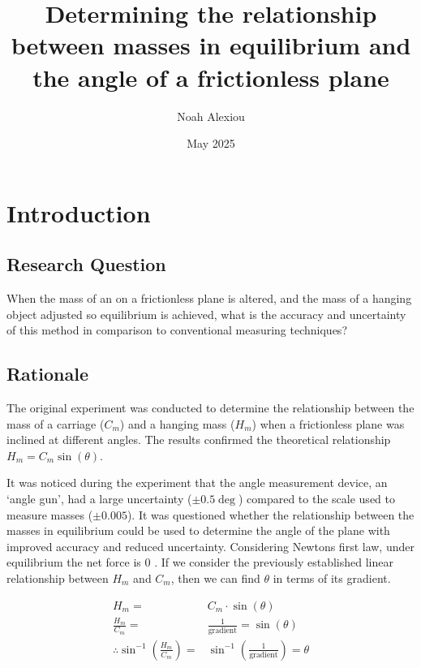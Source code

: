 \documentclass[11pt,a4paper]{article}
\begin{document}
\begin{titlepage}


\title{Determining the relationship between masses in equilibrium and the angle of a frictionless plane}

\author{Noah Alexiou}


\date{May 2025}

\maketitle
\centering

\end{titlepage}
\tableofcontents
\newpage

\section{Introduction}

\subsection{Research Question}
When the mass of an  on a frictionless plane is altered, and the mass of a hanging object adjusted so equilibrium is achieved, what is the accuracy and uncertainty of this method in comparison to conventional measuring techniques? 

\subsection{Rationale}

The original experiment was conducted to determine the relationship between the mass of a carriage ($C_m$) and a hanging mass ($H_m$) when a frictionless plane was inclined at different angles. The results confirmed the theoretical relationship $H_m = C_m \sin(\theta)$.

It was noticed during the experiment that the angle measurement device, an `angle gun', had a large uncertainty ($\pm0.5\deg$) compared to the scale used to measure masses ($\pm0.005$). It was questioned whether the relationship between the masses in equilibrium could be used to determine the angle of the plane with improved accuracy and reduced uncertainty. 
\newline
\newline
Considering Newtons first law, under equilibrium the net force is 0 \cite{encyclopediabritannica_2023_newtons}. If we consider the previously established linear relationship between $H_m$ and $C_m$, then we can find $\theta$ in terms of its gradient.
\begin{center}
	\begin{align*}
	H_m= &C_m\cdot{\sin(\theta)} \\
	\frac{H_m}{C_m}=&\frac{1}{\mathrm{gradient}}=\sin(\theta)\\
	\therefore \sin^{-1}\left(\frac{H_m}{{C_m}}\right)=&\sin^{-1}\left(\frac{1}{\textrm{gradient}}\right)=\theta
	\end{align*}
\end{center}
\end{document}

